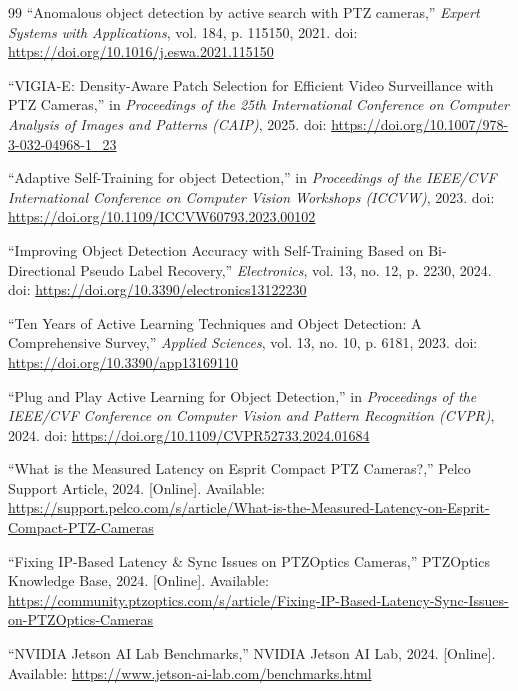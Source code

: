 \documentclass[conf]{new-aiaa}
\begin{document}
\begin{thebibliography}{99}
``Anomalous object detection by active search with PTZ cameras,'' \textit{Expert Systems with Applications}, vol. 184, p. 115150, 2021. doi: \url{https://doi.org/10.1016/j.eswa.2021.115150}

``VIGIA-E: Density-Aware Patch Selection for Efficient Video Surveillance with PTZ Cameras,'' in \textit{Proceedings of the 25th International Conference on Computer Analysis of Images and Patterns (CAIP)}, 2025. doi: \url{https://doi.org/10.1007/978-3-032-04968-1_23}

``Adaptive Self-Training for object Detection,'' in \textit{Proceedings of the IEEE/CVF International Conference on Computer Vision Workshops (ICCVW)}, 2023. doi: \url{https://doi.org/10.1109/ICCVW60793.2023.00102}

``Improving Object Detection Accuracy with Self-Training Based on Bi-Directional Pseudo Label Recovery,'' \textit{Electronics}, vol. 13, no. 12, p. 2230, 2024. doi: \url{https://doi.org/10.3390/electronics13122230}

``Ten Years of Active Learning Techniques and Object Detection: A Comprehensive Survey,'' \textit{Applied Sciences}, vol. 13, no. 10, p. 6181, 2023. doi: \url{https://doi.org/10.3390/app13169110}

``Plug and Play Active Learning for Object Detection,'' in \textit{Proceedings of the IEEE/CVF Conference on Computer Vision and Pattern Recognition (CVPR)}, 2024. doi: \url{https://doi.org/10.1109/CVPR52733.2024.01684}

``What is the Measured Latency on Esprit Compact PTZ Cameras?,'' Pelco Support Article, 2024. [Online]. Available: \url{https://support.pelco.com/s/article/What-is-the-Measured-Latency-on-Esprit-Compact-PTZ-Cameras}

``Fixing IP-Based Latency \& Sync Issues on PTZOptics Cameras,'' PTZOptics Knowledge Base, 2024. [Online]. Available: \url{https://community.ptzoptics.com/s/article/Fixing-IP-Based-Latency-Sync-Issues-on-PTZOptics-Cameras}

``NVIDIA Jetson AI Lab Benchmarks,'' NVIDIA Jetson AI Lab, 2024. [Online]. Available: \url{https://www.jetson-ai-lab.com/benchmarks.html}

\end{thebibliography}
\end{document}
